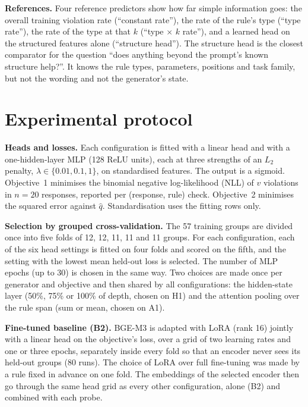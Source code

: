 \documentclass[10pt]{article}
\newcommand{\qhat}{\hat{q}}
\begin{document}
\textbf{References.} Four reference predictors show how far simple information goes: the overall training violation
rate (``constant rate''), the rate of the rule's type (``type rate''), the rate of the type at that $k$ (``type $\times$
$k$ rate''), and a learned head on the structured features alone (``structure head''). The structure head is the
closest comparator for the question ``does anything beyond the prompt's known structure help?''. It knows the rule
types, parameters, positions and task family, but not the wording and not the generator's state.

\section{Experimental protocol}
\label{sec:protocol}

\textbf{Heads and losses.} Each configuration is fitted with a linear head and with a one-hidden-layer MLP (128 ReLU
units), each at three strengths of an $L_2$ penalty, $\lambda\in\{0.01, 0.1, 1\}$, on standardised features. The output
is a sigmoid. Objective~1 minimises the binomial negative log-likelihood (NLL) of $v$ violations in $n=20$ responses,
reported per (response, rule) check. Objective~2 minimises the squared error against $\qhat$. Standardisation uses the
fitting rows only.

\textbf{Selection by grouped cross-validation.} The 57 training groups are divided once into five folds of 12, 12, 11,
11 and 11 groups. For each configuration, each of the six head settings is fitted on four folds and scored on the
fifth, and the setting with the lowest mean held-out loss is selected. The number of MLP epochs (up to 30) is chosen in
the same way. Two choices are made once per generator and objective and then shared by all configurations: the
hidden-state layer (50\%, 75\% or 100\% of depth, chosen on H1) and the attention pooling over the rule span (sum or
mean, chosen on A1).

\textbf{Fine-tuned baseline (B2).} BGE-M3 is adapted with LoRA \citep{hu2022lora} (rank 16) jointly with a linear head
on the objective's loss, over a grid of two learning rates and one or three epochs, separately inside every fold so
that an encoder never sees its held-out groups (80 runs). The choice of LoRA over full fine-tuning was made by a rule
fixed in advance on one fold. The embeddings of the selected encoder then go through the same head grid as every other
configuration, alone (B2) and combined with each probe.
\end{document}
